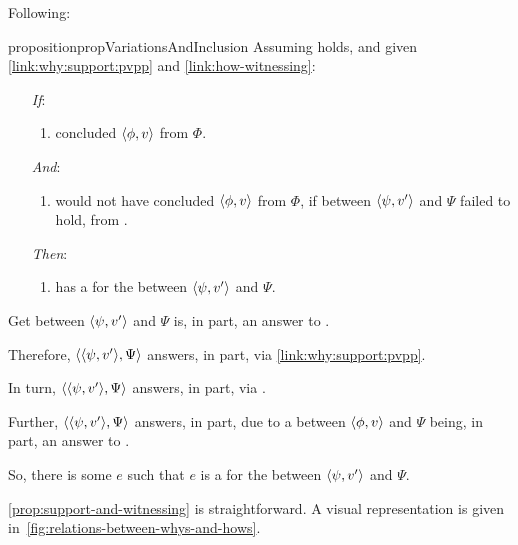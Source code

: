 \begin{note}
 Following:

  \begin{restatable}[]{proposition}{propVariationsAndInclusion}
    \label{prop:support-and-witnessing}
    Assuming \issueInclusion{} holds, and given \autoref{link:why:support:pvpp} and \autoref{link:how-witnessing}:
    \begin{enumerate}
    \item[\emph{If}:]
      \begin{enumerate}[label=\alph*., ref=(\alph*)]
      \item
        \vAgent{} concluded \(\langle \phi, v \rangle\) from \(\Phi\).
      \end{enumerate}
    \item[\emph{And}:]
      \begin{enumerate}[label=\alph*., ref=(\alph*), resume]
      \item
        \vAgent{} would not have concluded \(\langle \phi, v \rangle\) from \(\Phi\), if \support{} between \(\langle \psi, v' \rangle\) and \(\Psi\) failed to hold, from .
      \end{enumerate}
    \item[\emph{Then}:]
      \begin{enumerate}[label=\alph*., ref=(\alph*), resume]
      \item
        \vAgent{} has a  for the \ros{} between \(\langle \psi, v' \rangle\) and \(\Psi\).
      \end{enumerate}
    \end{enumerate}
    \begin{argument}
      Get \ros{} between \(\langle \psi, v' \rangle\) and \(\Psi\) is, in part, an answer to \qWhyVnP{}.

      Therefore, \(\langle \langle \psi, v' \rangle, \Psi \rangle\) answers, in part, \qWhy{} via \autoref{link:why:support:pvpp}.

      In turn, \(\langle \langle \psi, v' \rangle, \Psi \rangle\) answers, in part, \qHow{} via \issueInclusion{}.

      Further, \(\langle \langle \psi, v' \rangle, \Psi \rangle\) answers, in part, \qHow{} due to a \ros{} between \(\langle \phi, v \rangle\) and \(\Psi\) being, in part, an answer to \qWhyVnP{}.

      So, there is some \(e\) such that \(e\) is a  for the \ros{} between \(\langle \psi, v' \rangle\) and \(\Psi\).
    \end{argument}
  \end{restatable}

  \autoref{prop:support-and-witnessing} is straightforward.
  A visual representation is given in~\autoref{fig:relations-between-whys-and-hows}.
\end{note}

